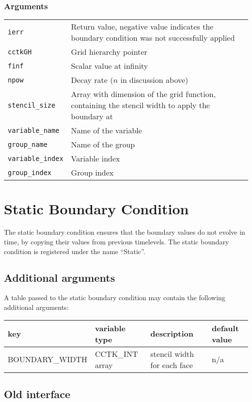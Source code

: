 \documentclass{article}
\begin{document}
\subsubsection*{Arguments}
\begin{tabular}{ll}
{\tt ierr} & Return value, negative value indicates the
boundary condition was not successfully applied\\
{\tt cctkGH} & Grid hierarchy pointer\\
{\tt finf} & Scalar value at infinity\\
{\tt npow} & Decay rate ($n$ in discussion above)\\
{\tt stencil\_size} & Array with dimension of the grid function, containing the stencil width to apply the boundary at\\
{\tt variable\_name} & Name of the variable\\
{\tt group\_name} & Name of the group\\
{\tt variable\_index} & Variable index\\
{\tt group\_index} & Group index
\end{tabular}


\section{Static Boundary Condition}

The static boundary condition ensures that the boundary values do not
evolve in time, by copying their values from previous timelevels.  The
static boundary condition is registered under the name ``Static''.

\subsection{Additional arguments}

A table passed to the static boundary condition may contain the
following additional arguments:\\[1mm]
\begin{tabular}{|l|l|l|l|}
\hline
\textbf{key} & \textbf{variable type} & \textbf{description} & \textbf{default value}\\
\hline
BOUNDARY\_WIDTH & CCTK\_INT array & stencil width for each face & n/a\\
\hline
\end{tabular}


\subsection{Old interface}
\end{document}
